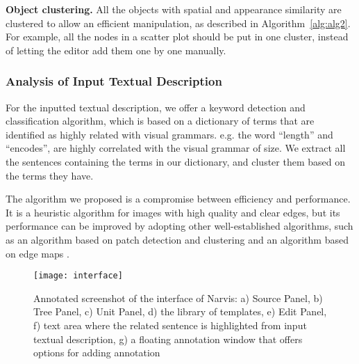 \noindent
\textbf{Object clustering.} All the objects with spatial and appearance similarity are clustered to allow an efficient manipulation, as described in Algorithm~\ref{alg:alg2}. For example, all the nodes in a scatter plot should be put in one cluster, instead of letting the editor add them one by one manually.     

\subsubsection{Analysis of Input Textual Description}
For the inputted textual description, we offer a keyword detection and classification algorithm, which is based on a dictionary of terms that are identified as highly related with visual grammars. e.g. the word ``length'' and ``encodes'', are highly correlated with the  visual grammar of size. We extract all the sentences containing the terms in our dictionary, and cluster them based on the terms they have.

The algorithm we proposed is a compromise between efficiency and performance. It is a heuristic algorithm for images with high quality and clear edges, but its performance can be improved by adopting other well-established algorithms, such as an algorithm based on patch detection and clustering \cite{savva_revision:_2011} and an algorithm based on edge maps \cite{huang2003model}.


     
\begin{figure}
 \centering %
 \texttt{[image: interface]}
 \caption{Annotated screenshot of the interface of Narvis: a) Source Panel, b) Tree Panel, c) Unit Panel, d) the library of templates, e) Edit Panel, f) text area where the related sentence is highlighted from input textual description, g) a floating annotation window that offers options for adding annotation}
 \label{fig:interface}
\end{figure}   



